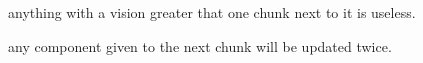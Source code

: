 
\begin{DoxyRefList}
\item[\label{bug__bug000001}%
\hypertarget{bug__bug000001}{}%
Class \hyperlink{class_chunk}{Chunk} ]anything with a vision greater that one chunk next to it is useless. 

any component given to the next chunk will be updated twice. 
\end{DoxyRefList}